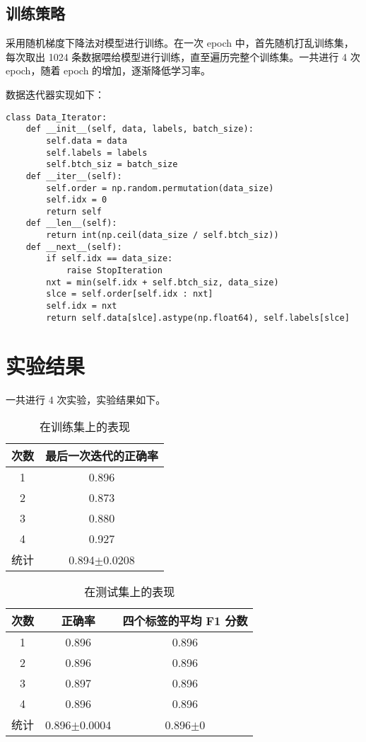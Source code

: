 \documentclass[12pt,letterpaper]{article}
\begin{document}
\subsection{训练策略}

采用随机梯度下降法对模型进行训练。在一次 epoch 中，首先随机打乱训练集，每次取出 1024 条数据喂给模型进行训练，直至遍历完整个训练集。一共进行 4 次 epoch，随着 epoch 的增加，逐渐降低学习率。

数据迭代器实现如下：

\begin{verbatim}
class Data_Iterator:
    def __init__(self, data, labels, batch_size):
        self.data = data
        self.labels = labels
        self.btch_siz = batch_size
    def __iter__(self):
        self.order = np.random.permutation(data_size)
        self.idx = 0
        return self
    def __len__(self):
        return int(np.ceil(data_size / self.btch_siz))
    def __next__(self):
        if self.idx == data_size:
            raise StopIteration
        nxt = min(self.idx + self.btch_siz, data_size)
        slce = self.order[self.idx : nxt]
        self.idx = nxt
        return self.data[slce].astype(np.float64), self.labels[slce]
\end{verbatim}

\section{实验结果}

一共进行 4 次实验，实验结果如下。

\begin{table}[h!]
    \centering
    \begin{tabular}{c|c}
        \textbf{次数} & \textbf{最后一次迭代的正确率}\\
        \hline
        1 & 0.896\\
        2 & 0.873\\
        3 & 0.880\\
        4 & 0.927\\
        统计 & 0.894$\pm$0.0208\\
    \end{tabular}
    \caption{在训练集上的表现}
    \label{tab:my_label}
\end{table}


\begin{table}[h!]
    \centering
    \begin{tabular}{c|c|c}
        \textbf{次数} & \textbf{正确率} & \textbf{四个标签的平均 F1 分数}\\
        \hline
        1 & 0.896 & 0.896\\
        2 & 0.896 & 0.896\\
        3 & 0.897 & 0.896\\
        4 & 0.896 & 0.896\\
        统计 & 0.896$\pm$0.0004 &0.896$\pm$0 \\
    \end{tabular}
    \caption{在测试集上的表现}
    \label{tab:my_label}
\end{table}
\end{document}
